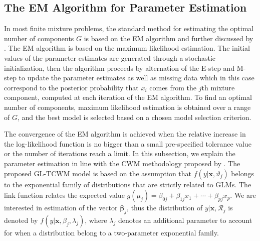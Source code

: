 \documentclass[11pt,letterpaper]{article}
\numberwithin{equation}{section}
\numberwithin{equation}{section}
\numberwithin{equation}{section}
\begin{document}
\subsection{The EM Algorithm for Parameter Estimation}
In most finite mixture problems, the standard method for estimating the optimal number of components $G$ is based on the EM algorithm and further discussed by \cite{McLachlan+Peel:2000}. %
The EM algorithm is based on the maximum likelihood estimation. %
The initial values of the parameter estimates are generated through a stochastic initialization, %
then the algorithm proceeds by alternation of the E-step and M-step to update the parameter estimates as well as missing data which in this case correspond to the posterior probability that $x_i$ comes from the $j$th mixture component, computed at each iteration of the EM algorithm. %
To find an optimal number of components, maximum likelihood estimation is obtained over a range of $G$, and the best model is selected based on a chosen model selection criterion. %

The convergence of the EM algorithm is achieved when the relative increase in the log-likelihood function is no bigger than a small pre-specified tolerance value or the number of iterations reach a limit. %
In this subsection, we explain the parameter estimation in line with the CWM methodology proposed by \cite{Ingrassia+Punzo+Vittadini+Minotti:2015}. The proposed GL-TCWM model is based on the assumption that $f(y|\bm{x},\vartheta_j)$ belongs to the exponential family of distributions that are strictly related to GLMs. The link function relates the expected value $g(\mu_j)= \beta_{0j} + \beta_{1j} x_{1}+ \cdots+\beta_{pj} x_{p}$. We are interested in estimation of the vector $\bm \beta_j$, thus the distribution of $y|\bm{x}, \mathcal{R}_j$ is denoted by $f(y|\bm{x},\beta_j, \lambda_j)$, where $\lambda_j$ denotes an additional parameter to account for when a distribution belong to a two-parameter exponential family.
\end{document}
